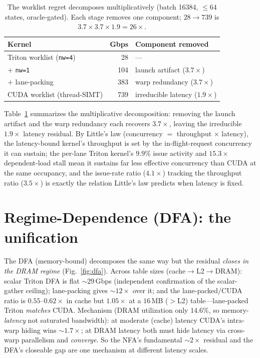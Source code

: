 \documentclass[conference]{IEEEtran}
\begin{document}
\begin{table}[t]\centering\small
\caption{The worklist regret decomposes multiplicatively (batch 16384, $\le 64$ states,
oracle-gated). Each stage removes one component; $28 \rightarrow 739$ is $3.7\times 3.7 \times
1.9 = 26\times$.}
\label{tab:decomp}
\setlength{\tabcolsep}{4pt}
\begin{tabular}{@{}lrl@{}}
\toprule
Kernel & Gbps & Component removed \\
\midrule
Triton worklist (\texttt{nw=4}) & 28 & --- \\
\quad $+$ \texttt{nw=1} & 104 & launch artifact ($3.7\times$) \\
\quad $+$ lane-packing & 383 & warp redundancy ($3.7\times$) \\
CUDA worklist (thread-SIMT) & 739 & irreducible latency ($1.9\times$) \\
\bottomrule
\end{tabular}
\end{table}

Table~\ref{tab:decomp} summarizes the multiplicative decomposition: removing the launch artifact
and the warp redundancy each recovers $3.7\times$, leaving the irreducible $1.9\times$ latency
residual. By Little's law (concurrency $=$ throughput $\times$ latency), the latency-bound kernel's
throughput is set by the in-flight-request concurrency it can sustain; the per-lane Triton kernel's
$9.9\%$ issue activity and $15.3\times$ dependent-load stall mean it sustains far less effective
concurrency than CUDA at the same occupancy, and the issue-rate ratio ($4.1\times$) tracking the
throughput ratio ($3.5\times$) is exactly the relation Little's law predicts when latency is fixed.

\section{Regime-Dependence (DFA): the unification}\label{sec:regime}
The DFA (memory-bound) decomposes the same way but the residual \emph{closes in the DRAM regime}
(Fig.~\ref{fig:dfa}). Across table sizes (cache$\rightarrow$L2$\rightarrow$DRAM): scalar Triton DFA is
flat ${\sim}29$\,Gbps (independent confirmation of the scalar-gather ceiling); lane-packing gives
${\sim}12\times$ over it; and the lane-packed/CUDA ratio is $0.55$--$0.62\times$ in cache but
$1.05\times$ at a $16$\,MB ($>$L2) table---lane-packed Triton \emph{matches} CUDA. Mechanism (DRAM
utilization only $14.6\%$, so memory-\emph{latency} not saturated bandwidth): at moderate (cache)
latency CUDA's intra-warp hiding wins ${\sim}1.7\times$; at DRAM latency both must hide latency via
cross-warp parallelism and \emph{converge}. So the NFA's fundamental ${\sim}2\times$ residual and the
DFA's closeable gap are one mechanism at different latency scales.
\end{document}
